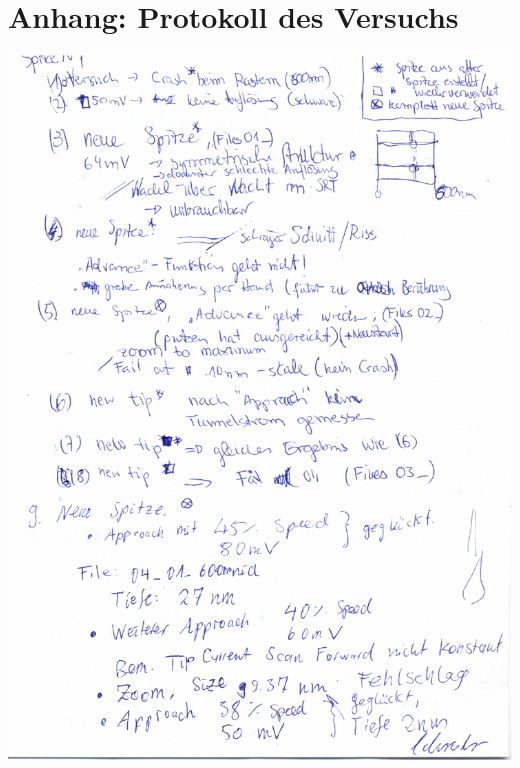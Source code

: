 \section{Anhang: Protokoll des Versuchs}
\includegraphics[width=\pagewidth]{protokoll/rtm_protokoll_01}
